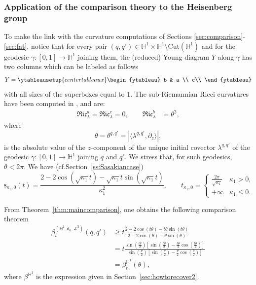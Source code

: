 \documentclass[11pt,a4paper]{article}
\theoremstyle{plain}
\theoremstyle{definition}
\theoremstyle{remark}
\numberwithin{equation}{section}
\newcommand{\Cut}{\mathrm{Cut}}
\newcommand{\sfs}{\mathsf{s}}
\newcommand{\sfd}{\mathsf d}
\begin{document}
\subsubsection{Application of the comparison theory to the Heisenberg group}
To make the link with the curvature computations of Sections \ref{sec:comparison}-\ref{sec:fat}, notice that for every pair  $(q,q')\in \mathbb{H}^1\times \mathbb{H}^1\setminus\Cut(\mathbb{H}^1)$ and for the geodesic $\gamma:[0,1]\to \mathbb{H}^1$ joining them, the (reduced) Young diagram $Y$ along $\gamma$ has two columns which can be labeled as follows
\[
Y=\ytableausetup{centertableaux}
\begin{ytableau}
b & a \\
c\\
\end{ytableau}
\]
with all sizes of the superboxes equal to 1. The sub-Riemannian Ricci curvatures have been computed in \cite{AAPL-Ricci}, and are:
\begin{align}
\mathfrak{Ric}^a_{\lambda} =\mathfrak{Ric}^c_{\lambda} = 0, \qquad
\mathfrak{Ric}^b_{\lambda} & = \theta^{2}, 
\end{align}
where
\begin{equation}
\theta = \theta^{q,q'}= |\langle \lambda^{q,q'}, \partial_z\rangle|,
\end{equation}
is the absolute value of the $z$-component of the unique initial covector $\lambda^{q,q'}$ of the geodesic $\gamma :[0,1]\to \mathbb{H}^1$ joining  $q$ and $q'$. We stress that, for such geodesics, $\theta<2\pi$.
We have (cf.\@ Section~\ref{ss:Sasakiancase})
\begin{equation}
\mathsf{\sfs}_{\kappa_1,0}(t) = 
\frac{2 -2 \cos \left(\sqrt{\kappa_1} t\right)-\sqrt{\kappa_1} t 
\sin \left(\sqrt{\kappa_1} t\right)}{\kappa_1^2}, 
\qquad t_{\kappa_1,0}
 = 
\begin{cases}
\tfrac{2\pi}{\sqrt{\kappa_1}} & \kappa_1>0, \\ +\infty & \kappa_1\leq 0.
\end{cases}
\end{equation}

From Theorem~\ref{thm:maincomparison}, one obtains the following comparison theorem
\begin{align}
\beta_{t}^{(\mathbb{H}^1,\sfd_0,\mathcal{L}^3)}(q,q')& \geq 
t\frac{2 -2 \cos \left(t\theta \right)-t\theta  
\sin \left(t\theta \right) }
{2 -2 \cos \left(\theta \right)-\theta  
\sin \left(\theta \right)}\\
& = t \frac{\sin\left(\frac{t\theta}{2}\right)\left[\sin\left(\frac{t\theta}{2}\right)-\frac{t\theta}{2}\cos\left(\frac{t\theta}{2}\right)\right]}{\sin\left(\frac{\theta}{2}\right)\left[\sin\left(\frac{\theta}{2}\right)-\frac{\theta}{2}\cos\left(\frac{\theta}{2}\right)\right]}\\
& = \beta^{\mathbb{H}^1}_t(\theta),
\end{align}
where $\beta^{\mathbb{H}^1}$ is the expression given in Section~\ref{sec:howtorecover2}.
\end{document}
